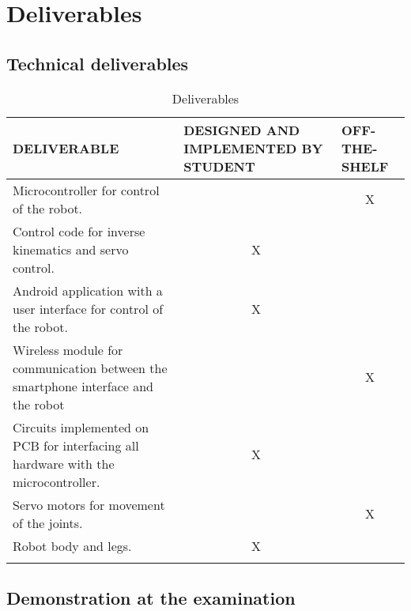 
\section{Deliverables}

\subsection{Technical deliverables}

\begin{center}
\begin{longtable}{|p{7cm}|p{3.5cm}|p{3.5cm}|}
\hline
\textbf{DELIVERABLE} & \textbf{DESIGNED AND IMPLEMENTED BY STUDENT} &
\textbf{OFF-THE-SHELF} \\
\hline  Microcontroller for control of the robot.
         &     & \multicolumn{1}{c|}{X}\\
\hline Control code for inverse kinematics and servo control.
         &   \multicolumn{1}{c|}{X}  &  \\
\hline Android application with a user interface for control of the robot.
         &   \multicolumn{1}{c|}{X}  &  \\
\hline Wireless module for communication between the smartphone interface and the robot
         &     &  \multicolumn{1}{c|}{X}\\
\hline Circuits implemented on PCB for interfacing all hardware with the microcontroller.
         &  \multicolumn{1}{c|}{X}   &  \\
\hline Servo motors for movement of the joints.
	&	&\multicolumn{1}{c|}{X}	\\
	\hline Robot body and legs.
	&	\multicolumn{1}{c|}{X}&	\\
\hline
\caption{Deliverables}
\end{longtable}
\end{center}

\subsection{Demonstration at the examination}

\newpage



